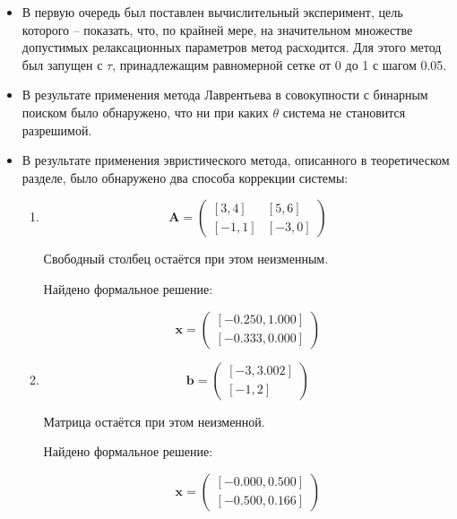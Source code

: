 \begin{itemize}
	\item В первую очередь был поставлен вычислительный эксперимент, цель которого -- показать, что, по крайней мере, на значительном множестве допустимых релаксационных параметров метод расходится. Для этого метод был запущен с $\tau$, принадлежащим равномерной сетке от 0 до 1 с шагом 0.05.
	
	\item В результате применения метода Лаврентьева в совокупности с бинарным поиском было обнаружено, что ни при каких $\theta$ система не становится разрешимой.
	
	\item В результате применения эвристического метода, описанного в теоретическом разделе, было обнаружено два способа коррекции системы:
	
	\begin{enumerate}
		\item 
		\begin{equation}
		\mathbf{A}=
		\begin{pmatrix}
		[3, 4] & [5, 6] \\
		[-1, 1] & [-3, 0]
		\end{pmatrix}
		\end{equation}
		
		Свободный столбец остаётся при этом неизменным.
		
		Найдено формальное решение:
		
		\begin{equation}
		\mathbf{x}=
		\begin{pmatrix}
		[-0.250, 1.000]\\
		[-0.333, 0.000]
		\end{pmatrix}
		\end{equation}
		
		\item
		\begin{equation}
		\mathbf{b}=
		\begin{pmatrix}
		[-3, 3.002]\\
		[-1, 2]
		\end{pmatrix}
		\end{equation}
		
		Матрица остаётся при этом неизменной.
		
		Найдено формальное решение:
		
		\begin{equation}
		\mathbf{x}=
		\begin{pmatrix}
		[-0.000, 0.500]\\
		[-0.500, 0.166]
		\end{pmatrix}
		\end{equation}
	\end{enumerate}
	
\end{itemize}